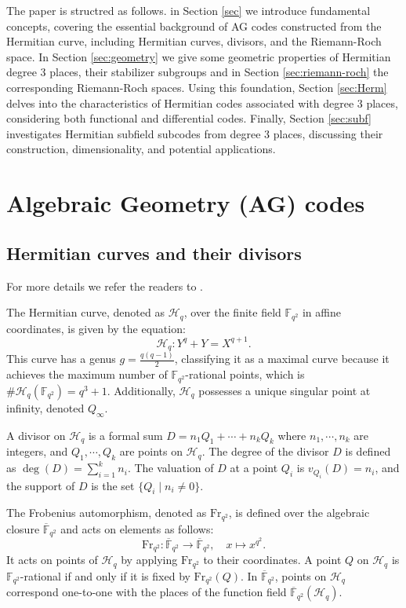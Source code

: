 \documentclass[11pt]{amsart}
\theoremstyle{plain}
\theoremstyle{definition}
\theoremstyle{remark}
\begin{document}
The paper is structred as follows. in Section \ref{sec} we introduce fundamental concepts, covering the essential background of AG codes constructed from the Hermitian curve, including Hermitian curves, divisors, and the Riemann-Roch space. In Section \ref{sec:geometry} we give some geometric properties of Hermitian degree 3 places, their stabilizer subgroups and in Section \ref{sec:riemann-roch} the corresponding Riemann-Roch spaces. Using this foundation, Section \ref{sec:Herm} delves into the characteristics of Hermitian codes associated with degree 3 places, considering both functional and differential codes. Finally, Section \ref{sec:subf} investigates Hermitian subfield subcodes from degree 3 places, discussing their construction, dimensionality, and potential applications.


\section{Algebraic Geometry (AG) codes \label{sec}}

\subsection{Hermitian curves and their divisors}

For more details we refer the readers to \cite{stichtenoth2009algebraic, stepanov2012codes,cossidente1999curves}.


The Hermitian curve, denoted as $\mathscr{H}_q$, over the finite field $\mathbb{F}_{q^2}$ in affine coordinates, is given by the equation:
\[
	\mathscr{H}_q: Y^q + Y = X^{q+1}.
\]
This curve has a genus $g = \frac{q(q-1)}{2}$, classifying it as a maximal curve because it achieves the maximum number of $\mathbb{F}_{q^2}$-rational points, which is $\#\mathscr{H}_q(\mathbb{F}_{q^2}) = q^3 + 1$. Additionally, $\mathscr{H}_q$ possesses a unique singular point at infinity, denoted $Q_{\infty}$.

A divisor on $\mathscr{H}_q$ is a formal sum $D = n_1 Q_1 + \cdots + n_k Q_k$ where $n_1, \cdots, n_k$ are integers, and $Q_1, \cdots, Q_k$ are points on $\mathscr{H}_q$. The degree of the divisor $D$ is defined as $\deg(D) = \sum_{i=1}^k n_i$. The valuation of $D$ at a point $Q_i$ is $v_{Q_i}(D) = n_i$, and the support of $D$ is the set $\{ Q_i \mid n_i \neq 0 \}$.

The Frobenius automorphism, denoted as $\text{Fr}_{q^2}$, is defined over the algebraic closure $\overline{\mathbb{F}}_{q^2}$ and acts on elements as follows:
\[
	\text{Fr}_{q^2}: \overline{\mathbb{F}}_{q^2} \to \overline{\mathbb{F}}_{q^2}, \quad x \mapsto x^{q^2}.
\]
It acts on points of $\mathscr{H}_q$ by applying $\text{Fr}_{q^2}$ to their coordinates. A point $Q$ on $\mathscr{H}_q$ is $\mathbb{F}_{q^2}$-rational if and only if it is fixed by $\text{Fr}_{q^2}(Q)$. In $\overline{\mathbb{F}}_{q^2}$, points on $\mathscr{H}_q$ correspond one-to-one with the places of the function field $\overline{\mathbb{F}}_{q^2}(\mathscr{H}_q)$.
\end{document}
